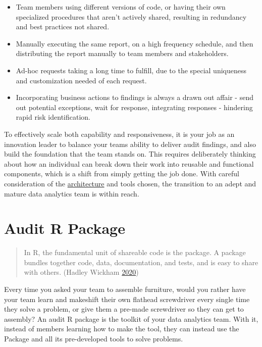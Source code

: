 \documentclass[
]{book}
\providecommand{\tightlist}{%
  \setlength{\itemsep}{0pt}\setlength{\parskip}{0pt}}
\begin{document}
\begin{itemize}
\tightlist
\item
  Team members using different versions of code, or having their own specialized procedures that aren't actively shared, resulting in redundancy and best practices not shared.
\item
  Manually executing the same report, on a high frequency schedule, and then distributing the report manually to team members and stakeholders.
\item
  Ad-hoc requests taking a long time to fulfill, due to the special uniqueness and customization needed of each request.
\item
  Incorporating business actions to findings is always a drawn out affair - send out potential exceptions, wait for response, integrating responses - hindering rapid risk identification.
\end{itemize}

To effectively scale both capability and responsiveness, it is your job as an innovation leader to balance your teams ability to deliver audit findings, and also build the foundation that the team stands on. This requires deliberately thinking about how an individual can break down their work into reusable and functional components, which is a shift from simply getting the job done. With careful consideration of the \protect\hyperlink{architecture}{architecture} and tools chosen, the transition to an adept and mature data analytics team is within reach.

\hypertarget{auditpackage}{%
\chapter{Audit R Package}\label{auditpackage}}

\begin{quote}
In R, the fundamental unit of shareable code is the package. A package bundles together code, data, documentation, and tests, and is easy to share with others. (Hadley Wickham \protect\hyperlink{ref-r-pkgs}{2020})
\end{quote}

Every time you asked your team to assemble furniture, would you rather have your team learn and makeshift their own flathead screwdriver every single time they solve a problem, or give them a pre-made screwdriver so they can get to assembly? An audit R package is the toolkit of your data analytics team. With it, instead of members learning how to make the tool, they can instead use the Package and all its pre-developed tools to solve problems.
\end{document}
